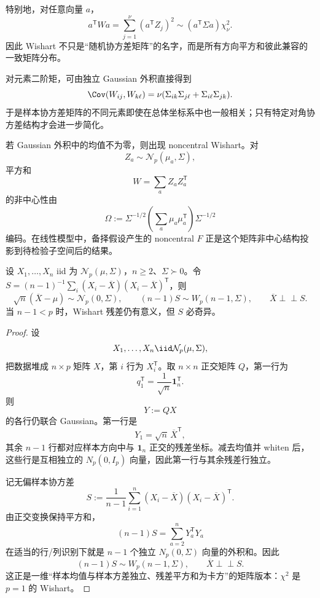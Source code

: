特别地，对任意向量 $a$，
\[
a^{\mathsf T}Wa
=\sum_{j=1}^{\nu}(a^{\mathsf T}Z_j)^2
\sim
(a^{\mathsf T}\Sigma a)\chi^2_\nu.
\]
因此 Wishart 不只是“随机协方差矩阵”的名字，而是所有方向平方和彼此兼容的一致矩阵分布。

对元素二阶矩，可由独立 Gaussian 外积直接得到
\begin{equation*}\Cov(W_{ij},W_{k\ell})
=\nu(\Sigma_{ik}\Sigma_{j\ell}+\Sigma_{i\ell}\Sigma_{jk}).\end{equation*}
于是样本协方差矩阵的不同元素即使在总体坐标系中也一般相关；只有特定对角协方差结构才会进一步简化。

若 Gaussian 外积中的均值不为零，则出现 noncentral Wishart。对
\[
Z_a\sim\mathcal N_p(\mu_a,\Sigma),
\]
平方和
\[
W=\sum_aZ_aZ_a^{\mathsf T}
\]
的非中心性由
\[
\Omega
:=\Sigma^{-1/2}
\left(\sum_a\mu_a\mu_a^{\mathsf T}\right)
\Sigma^{-1/2}
\]
编码。在线性模型中，备择假设产生的 noncentral $F$ 正是这个矩阵非中心结构投影到待检验子空间后的结果。

\begin{theorem}
设 $X_1,\ldots,X_n$ iid 为 $\mathcal N_p(\mu,\Sigma)$，$n\ge2$、$\Sigma\succ0$。令 $S=(n-1)^{-1}\sum_i(X_i-\overline X)(X_i-\overline X)^{\mathsf T}$，则
\[
\sqrt n(\overline X-\mu)\sim\mathcal N_p(0,\Sigma),\qquad
(n-1)S\sim W_p(n-1,\Sigma),\qquad\overline X\perp\!\!\!\perp S.
\]
当 $n-1<p$ 时，Wishart 残差仍有意义，但 $S$ 必奇异。
\end{theorem}
\begin{proof}
设
\[
X_1,\ldots,X_n\iid\mathcal N_p(\mu,\Sigma),
\]
把数据堆成 $n\times p$ 矩阵 $X$，第 $i$ 行为 $X_i^{\mathsf T}$。取 $n\times n$ 正交矩阵 $Q$，第一行为
\[
q_1^{\mathsf T}=\frac1{\sqrt n}\mathbf1_n^{\mathsf T}.
\]
则
\[
Y:=QX
\]
的各行仍联合 Gaussian。第一行是
\[
Y_1=\sqrt n\,\overline X^{\mathsf T},
\]
其余 $n-1$ 行都对应样本方向中与 $\mathbf1_n$ 正交的残差坐标。减去均值并 whiten 后，这些行是互相独立的 $N_p(0,I_p)$ 向量，因此第一行与其余残差行独立。

记无偏样本协方差
\[
S
:=\frac1{n-1}\sum_{i=1}^n
(X_i-\overline X)(X_i-\overline X)^{\mathsf T}.
\]
由正交变换保持平方和，
\[
(n-1)S
=\sum_{a=2}^{n}Y_a^{\mathsf T}Y_a
\]
在适当的行/列识别下就是 $n-1$ 个独立 $N_p(0,\Sigma)$ 向量的外积和。因此
\begin{equation}
\boxed{
(n-1)S\sim W_p(n-1,\Sigma),
\qquad
\overline X\perp\!\!\!\perp S.
}
\label{eq:math-stat-normal-mean-wishart-independence}
\end{equation}
这正是一维“样本均值与样本方差独立、残差平方和为卡方”的矩阵版本：$\chi^2$ 是 $p=1$ 的 Wishart。
\end{proof}


